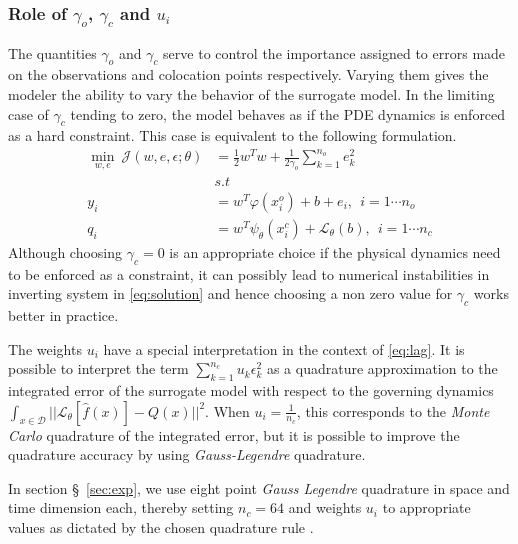 \subsubsection*{Role of $\gamma_o$, $\gamma_c$ and $u_i$}

The quantities $\gamma_o$ and $\gamma_c$ serve to control the importance assigned to errors made 
on the observations and colocation points respectively. Varying them gives the modeler the ability 
to vary the behavior of the surrogate model. In the limiting case of $\gamma_c$ tending to zero, 
the model behaves as if the PDE dynamics is enforced as a hard constraint. This case is equivalent 
to the following formulation.
%
\begin{equation}\label{eq:surrogate2}
   \begin{aligned}
    \min_{w,e} \ \mathcal{J}(w,e,\epsilon;\theta) &= 
    \frac{1}{2} w^{T}w + \frac{1}{2\gamma_{o}} \sum_{k = 1}^{n_{o}}{e^{2}_{k}} \\
    & s.t \\
    y_{i} & = w^{T}\varphi(x^{o}_{i}) + b + e_{i}, \ \ i = 1 \cdots n_{o} \\
    q_{i} & = w^{T}\psi_{\theta}(x^{c}_{i}) + \mathcal{L}_{\theta}(b), \ \ i = 1 \cdots n_{c}
   \end{aligned}
\end{equation}
%
Although choosing $\gamma_c = 0$ is an appropriate choice if the physical dynamics need to be 
enforced as a constraint, it can possibly lead to numerical instabilities in inverting system in 
\cref{eq:solution} and hence choosing a non zero value for $\gamma_c$ works better in practice. 

The weights $u_i$ have a special interpretation in the context of \cref{eq:lag}. It is possible to
interpret the term $\sum_{k = 1}^{n_{c}}{u_{k} \epsilon^{2}_{k}}$ as a quadrature approximation
to the integrated error of the surrogate model with respect to the governing dynamics 
$\int_{x \in \mathcal{D}}{||\mathcal{L}_{\theta} [\hat{f}(x)] - Q(x)||^2}$. When 
$u_i = \frac{1}{n_c}$, this corresponds to the \emph{Monte Carlo} quadrature of the integrated 
error, but it is possible to improve the quadrature accuracy by using \emph{Gauss-Legendre} 
quadrature.

In section \S~\ref{sec:exp}, we use eight point \emph{Gauss Legendre} quadrature in space and time 
dimension each, thereby setting $n_c = 64$ and weights $u_i$ to appropriate values as dictated by 
the chosen quadrature rule \citep{_abramowitzm}.

